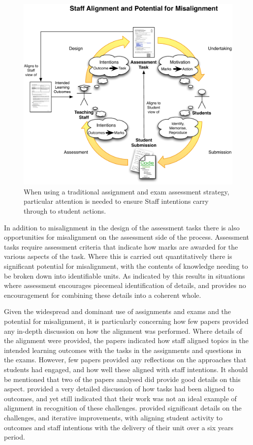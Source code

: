\begin{figure}[p]
	\centering
	\includegraphics[width=\textwidth]{Misalignment}
	\caption{When using a traditional assignment and exam assessment strategy, particular attention is needed to ensure Staff intentions carry through to student actions.}
	\label{fig:misalignment}
\end{figure}

In addition to misalignment in the design of the assessment tasks there is also opportunities for misalignment on the assessment side of the process. Assessment tasks require assessment criteria that indicate how marks are awarded for the various aspects of the task. Where this is carried out quantitatively there is significant potential for misalignment, with the contents of knowledge needing to be broken down into identifiable units. As indicated by \citet{Biggs:1996c} this results in situations where assessment encourages piecemeal identification of details, and provides no encouragement for combining these details into a coherent whole.

Given the widespread and dominant use of assignments and exams and the potential for misalignment, it is particularly concerning how few papers provided any in-depth discussion on how the alignment was performed. Where details of the alignment were provided, the papers indicated how staff aligned topics in the intended learning outcomes with the tasks in the assignments and questions in the exams. However, few papers provided any reflections on the approaches that students had engaged, and how well these aligned with staff intentions. It should be mentioned that two of the papers analysed did provide good details on this aspect. \citet{Brabrand:2008} provided a very detailed discussion of how tasks had been aligned to outcomes, and yet still indicated that their work was not an ideal example of alignment in recognition of these challenges. \citet{Hill:2009} provided significant details on the challenges, and iterative improvements, with aligning student activity to outcomes and staff intentions with the delivery of their unit over a six years period. 

